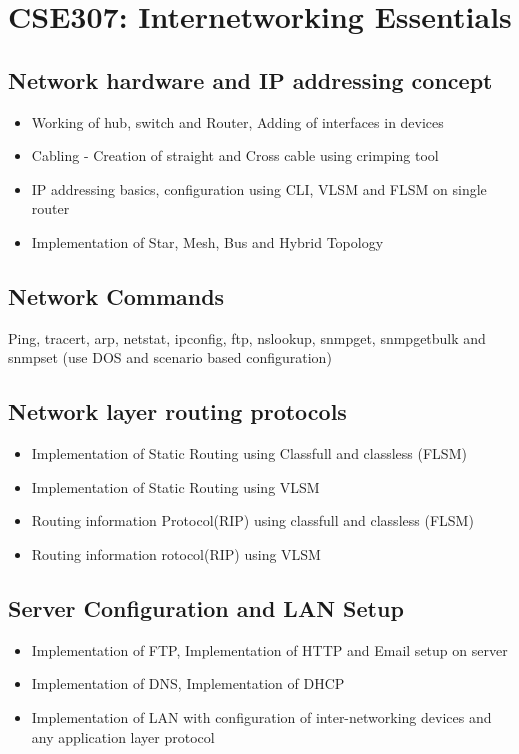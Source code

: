 \documentclass[twocolumn]{article}
\begin{document}
    \section*{CSE307: Internetworking Essentials}
    \subsection*{Network hardware and IP addressing concept}
    \begin{itemize}
        \item Working of hub, switch and Router, Adding of interfaces in devices
        \item Cabling - Creation of straight and Cross cable using crimping tool
        \item IP addressing basics, configuration using CLI, VLSM and FLSM on single router
        \item Implementation of Star, Mesh, Bus and Hybrid Topology
    \end{itemize}
    \subsection*{Network Commands}
    Ping, tracert, arp, netstat, ipconfig, ftp, nslookup, snmpget, snmpgetbulk and snmpset (use DOS and scenario based configuration)
    \subsection*{Network layer routing protocols}
    \begin{itemize}
        \item Implementation of Static Routing using Classfull and classless (FLSM)
        \item Implementation of Static Routing using VLSM
        \item Routing information Protocol(RIP) using classfull and classless (FLSM)
        \item Routing information rotocol(RIP) using VLSM
    \end{itemize}
    \subsection*{Server Configuration and LAN Setup}
    \begin{itemize}
        \item Implementation of FTP, Implementation of HTTP and Email setup on server
        \item Implementation of DNS, Implementation of DHCP
        \item Implementation of LAN with configuration of inter-networking devices and any application layer 
        protocol
    \end{itemize}
\end{document}
